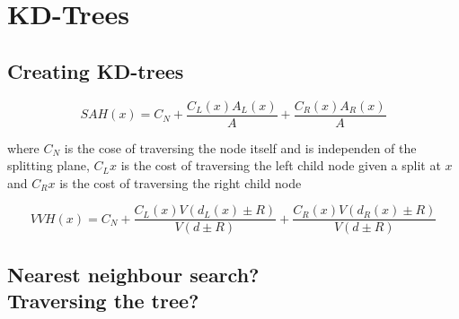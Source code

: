 \chapter{KD-Trees}



\section{Creating KD-trees}


\begin{displaymath}
  SAH(x) = C_N + \frac{C_L(x) A_L(x)}{A} + \frac{C_R(x) A_R(x)}{A}
\end{displaymath}

where $C_N$ is the cose of traversing the node itself and is
independen of the splitting plane, $C_L{x}$ is the cost of traversing
the left child node given a split at $x$ and $C_R{x}$ is the cost of
traversing the right child node

\begin{displaymath}
  VVH(x) = C_N + \frac{C_L(x) V(d_L(x) \pm R)}{V(d \pm R)} +
  \frac{C_R(x) V(d_R(x) \pm R)}{V(d \pm R)}
\end{displaymath}




\section{Nearest neighbour search?\\Traversing the tree?}



